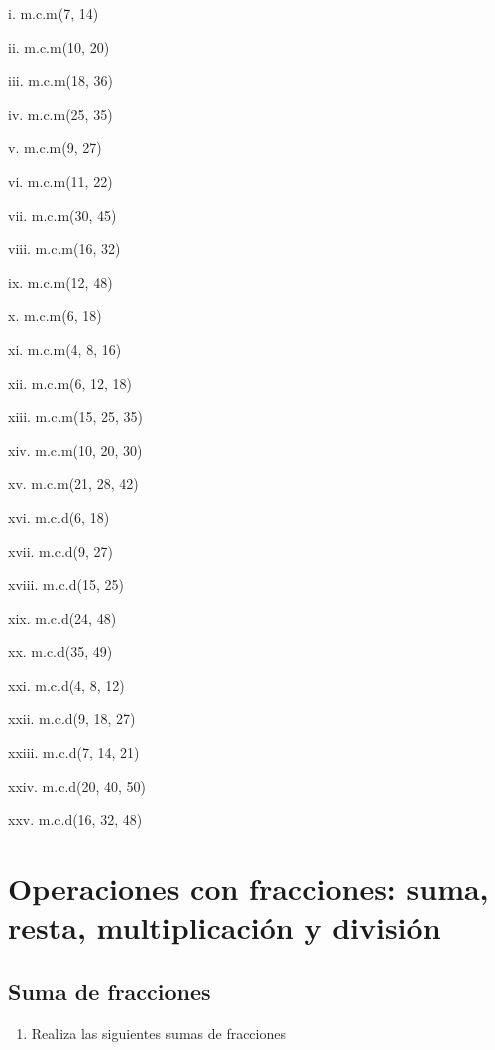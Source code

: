 \documentclass[]{book}
\providecommand{\tightlist}{%
  \setlength{\itemsep}{0pt}\setlength{\parskip}{0pt}}
\begin{document}
\begin{multicols}{2}
  
    i. m.c.m(7, 14)
  
    ii. m.c.m(10, 20)
  
    iii. m.c.m(18, 36)
  
    iv. m.c.m(25, 35)
  
    v. m.c.m(9, 27)
  
    vi. m.c.m(11, 22)
  
    vii. m.c.m(30, 45)
  
    viii. m.c.m(16, 32)
  
    ix. m.c.m(12, 48)
  
    x. m.c.m(6, 18)
  
    xi. m.c.m(4, 8, 16)
  
    xii. m.c.m(6, 12, 18)
  
    xiii. m.c.m(15, 25, 35)
  
    xiv. m.c.m(10, 20, 30)
  
    xv. m.c.m(21, 28, 42)
  
    xvi. m.c.d(6, 18)
  
    xvii. m.c.d(9, 27)
  
    xviii. m.c.d(15, 25)
  
    xix. m.c.d(24, 48)
  
    xx. m.c.d(35, 49)
  
    xxi. m.c.d(4, 8, 12)
  
    xxii. m.c.d(9, 18, 27)
  
    xxiii. m.c.d(7, 14, 21)
  
    xxiv. m.c.d(20, 40, 50)
  
    xxv. m.c.d(16, 32, 48)
\end{multicols}

\section{Operaciones con fracciones: suma, resta, multiplicación y
división}\label{operaciones-con-fracciones-suma-resta-multiplicaciuxf3n-y-divisiuxf3n}

\subsection{Suma de fracciones}\label{suma-de-fracciones}

\begin{enumerate}
\def\labelenumi{\arabic{enumi}.}
\tightlist
\item
  Realiza las siguientes sumas de fracciones
\end{enumerate}
\end{document}

